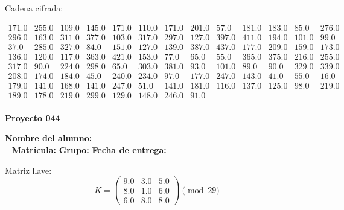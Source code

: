 \documentclass[12pt]{article}
\begin{document}
Cadena cifrada:
\begin{center}
$\begin{array}{lllllllllllll}
171.0 & 255.0 & 109.0 & 145.0 & 171.0 & 110.0 & 171.0 & 201.0 & 57.0 & 181.0 & 183.0 & 85.0 & 276.0\\
296.0 & 163.0 & 311.0 & 377.0 & 103.0 & 317.0 & 297.0 & 127.0 & 397.0 & 411.0 & 194.0 & 101.0 & 99.0\\
37.0 & 285.0 & 327.0 & 84.0 & 151.0 & 127.0 & 139.0 & 387.0 & 437.0 & 177.0 & 209.0 & 159.0 & 173.0\\
136.0 & 120.0 & 117.0 & 363.0 & 421.0 & 153.0 & 77.0 & 65.0 & 55.0 & 365.0 & 375.0 & 216.0 & 255.0\\
317.0 & 90.0 & 224.0 & 298.0 & 65.0 & 303.0 & 381.0 & 93.0 & 101.0 & 89.0 & 90.0 & 329.0 & 339.0\\
208.0 & 174.0 & 184.0 & 45.0 & 240.0 & 234.0 & 97.0 & 177.0 & 247.0 & 143.0 & 41.0 & 55.0 & 16.0\\
179.0 & 141.0 & 168.0 & 141.0 & 247.0 & 51.0 & 141.0 & 181.0 & 116.0 & 137.0 & 125.0 & 98.0 & 219.0\\
189.0 & 178.0 & 219.0 & 299.0 & 129.0 & 148.0 & 246.0 & 91.0\\
\end{array}$
\end{center}

\newpage


\textbf{Proyecto 044}

\textbf{Nombre del alumno:} \underline{\hspace{13cm}}\\\
\vspace{1cm}
\textbf{Matrícula:} \underline{\hspace{4cm}} \hspace{1cm}
\textbf{Grupo:} \underline{\hspace{2cm}}
\textbf{Fecha de entrega:} \underline{\hspace{2cm}}

\medskip

Matriz llave:
\[
K = \begin{pmatrix}
9.0 & 3.0 & 5.0\\
8.0 & 1.0 & 6.0\\
6.0 & 8.0 & 8.0
\end{pmatrix} \pmod{29}
\]
\end{document}
